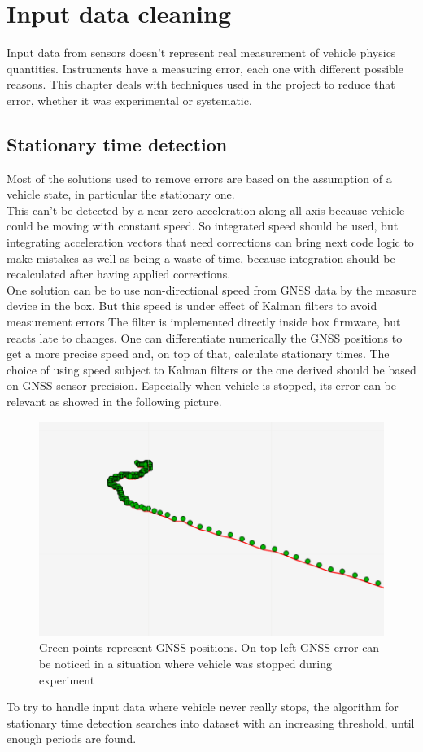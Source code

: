 \chapter{Input data cleaning}
\label{chap:input_data_cleaning}

Input data from sensors doesn't represent real measurement of vehicle physics quantities. Instruments have a measuring error, each one with different possible reasons. This chapter deals with techniques used in the project to reduce that error, whether it was experimental or systematic.

\section{Stationary time detection}
Most of the solutions used to remove errors are based on the assumption of a vehicle state, in particular the stationary one. \\
This can't be detected by a near zero acceleration along all axis because vehicle could be moving with constant speed. So integrated speed should be used, but integrating acceleration vectors that need corrections can bring next code logic to make mistakes as well as being a waste of time, because integration should be recalculated after having applied corrections. \\
One solution can be to use non-directional speed from GNSS data by the measure device in the box. But this speed is under effect of Kalman filters to avoid measurement errors The filter is implemented directly inside box firmware, but reacts late to changes. One can differentiate numerically the GNSS positions to get a more precise speed and, on top of that, calculate stationary times. The choice of using speed subject to Kalman filters or the one derived should be based on GNSS sensor precision. Especially when vehicle is stopped, its error can be relevant as showed in the following picture.
\begin{figure}[H]
\includegraphics[width=\textwidth]{gnss_error_stationary_vehicle}
\caption{Green points represent GNSS positions. On top-left GNSS error can be noticed in a situation where vehicle was stopped during experiment}
\end{figure}
To try to handle input data where vehicle never really stops, the algorithm for stationary time detection searches into dataset with an increasing threshold, until enough periods are found.

